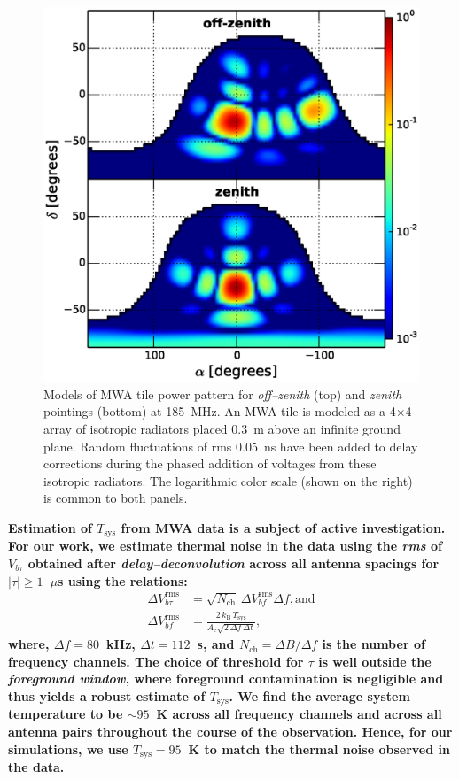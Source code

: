 \documentclass[preprint2,iop,numberedappendix]{emulateapj}
\begin{document}
\begin{figure}[htb]
\centering
\includegraphics[width=\linewidth]{fig4.eps}
\caption{Models of MWA tile power pattern for {\it off--zenith} (top) and {\it zenith} pointings (bottom) at 185~MHz. An MWA tile is modeled as a 4$\times$4 array of isotropic radiators placed 0.3~m above an infinite ground plane. Random fluctuations of rms 0.05~ns have been added to delay corrections during the phased addition of voltages from these isotropic radiators. The logarithmic color scale (shown on the right) is common to both panels. \label{fig:power_pattern}}
\end{figure}

{\bf Estimation of $T_\textrm{sys}$ from MWA data is a subject of active investigation. For our work, we estimate thermal noise in the data using the {\it rms} of $V_{b\tau}$ obtained after {\it delay--deconvolution} across all antenna spacings for $|\tau| \geq 1$~$\mu$s using the relations:
\begin{align}\label{eqn:Tsys}
  \Delta V_{b\tau}^\textrm{rms} &= \sqrt{N_\textrm{ch}}\,\Delta V_{bf}^\textrm{rms} \Delta f, \textrm{and} \\
  \Delta V_{bf}^\textrm{rms} &= \frac{2\,k_\textrm{B}\,T_\textrm{sys}}{A_\textrm{e}\sqrt{2\,\Delta f\,\Delta t}},
\end{align}
where, $\Delta f = 80$~kHz, $\Delta t = 112$~s, and $N_\textrm{ch}=\Delta B/\Delta f$ is the number of frequency channels. The choice of threshold for $\tau$ is well outside the {\it foreground window}, where foreground contamination is negligible and thus yields a robust estimate of $T_\textrm{sys}$. We find the average system temperature to be $\sim 95$~K across all frequency channels and across all antenna pairs throughout the course of the observation. Hence, for our simulations, we use $T_\textrm{sys}=95$~K to match the thermal noise observed in the data.} 
\end{document}
